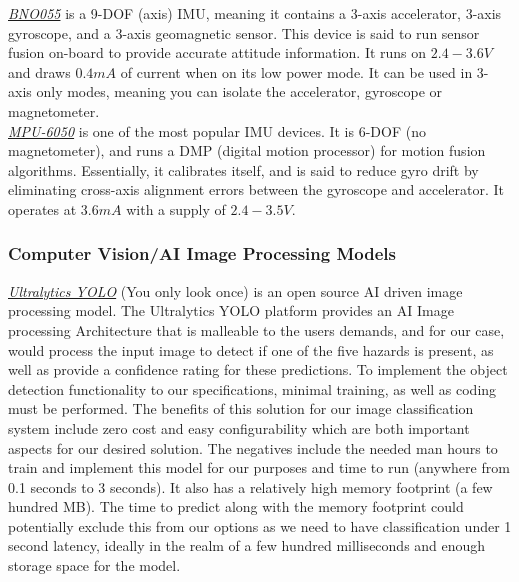 \noindent \underline{\textit{BNO055}} is a 9-DOF (axis) IMU, meaning it contains a 3-axis accelerator, 3-axis gyroscope, and a 3-axis geomagnetic sensor. This device is said to run sensor fusion on-board to provide accurate attitude information. It runs on $2.4-3.6V$ and draws $0.4mA$ of current when on its low power mode. It can be used in 3-axis only modes, meaning you can isolate the accelerator, gyroscope or magnetometer.\\

\noindent \underline{\textit{MPU-6050}} is one of the most popular IMU devices. It is 6-DOF (no magnetometer), and runs a DMP (digital motion processor) for motion fusion algorithms. Essentially, it calibrates itself, and is said to reduce gyro drift by eliminating cross-axis alignment errors between the gyroscope and accelerator. It operates at $3.6mA$ with a supply of $2.4-3.5V$.\\

\subsubsection{Computer Vision/AI Image Processing Models}
\underline{\textit{Ultralytics YOLO}} (You only look once) is an open source AI driven image processing model. The Ultralytics YOLO platform provides an AI Image processing Architecture that is malleable to the users demands, and for our case, would process the input image to detect if one of the five hazards is present, as well as provide a confidence rating for these predictions. To implement the object detection functionality to our specifications, minimal training, as well as coding must be performed. The benefits of this solution for our image classification system include zero cost and easy configurability which are both important aspects for our desired solution. The negatives include the needed man hours to train and implement this model for our purposes and time to run (anywhere from 0.1 seconds to 3 seconds). It also has a relatively high memory footprint (a few hundred MB). The time to predict along with the memory footprint could potentially exclude this from our options as we need to have classification under 1 second latency, ideally in the realm of a few hundred milliseconds and enough storage space for the model. \\

